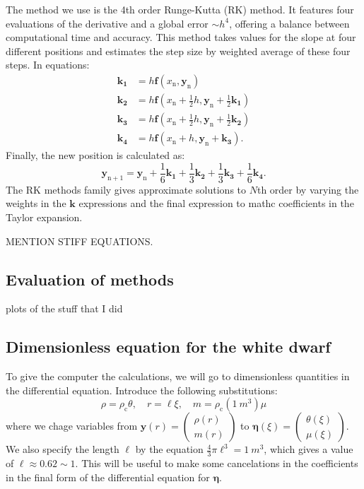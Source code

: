 \documentclass[]{article}
\renewcommand{\vec}[1]{\boldsymbol{#1}}
\begin{document}
	The method we use is the 4th order Runge-Kutta (RK) method. It features four evaluations of the derivative and a global error $\sim h^4$, offering a balance between computational time and accuracy. This method takes values for the slope at four different positions and estimates the step size by weighted average of these four steps. In equations:
	\begin{align*}
		\vec{k_1} &= h \vec{f}(x_\mathrm{n}, \vec{y}_\mathrm{n})\\
		\vec{k_2} &= h \vec{f}\left(x_\mathrm{n} + \frac{1}{2} h, \vec{y}_\mathrm{n} + \frac{1}{2}\vec{k_1}\right)\\
		\vec{k_3} &= h \vec{f}\left(x_\mathrm{n} + \frac{1}{2} h, \vec{y}_\mathrm{n} + \frac{1}{2}\vec{k_2}\right)\\
		\vec{k_4} &= h \vec{f}(x_\mathrm{n} + h, \vec{y}_\mathrm{n} + \vec{k_3}).
	\end{align*}
	Finally, the new position is calculated as:
	\begin{equation}
		\vec{y}_\mathrm{n+1} = \vec{y}_\mathrm{n} + \frac{1}{6} \vec{k_1} + \frac{1}{3} \vec{k_2} + \frac{1}{3} \vec{k_3} + \frac{1}{6} \vec{k_4}.
	\end{equation}
	The RK methods family gives approximate solutions to $N$th order by varying the weights in the $\vec{k}$ expressions and the final expression to mathc coefficients in the Taylor expansion.

	{\color{red} MENTION STIFF EQUATIONS.}

\subsection{Evaluation of methods}
	plots of the stuff that I did
\subsection{Dimensionless equation for the white dwarf}
	To give the computer the calculations, we will go to dimensionless quantities in the differential equation. Introduce the following substitutions:
	\begin{equation}
		\rho = \rho_\mathrm{c} \theta, \quad r = \ell \xi, \quad m = \rho_\mathrm{c} (\SI{1}{m^3}) \mu
	\end{equation}
	where we chage variables from $\vec{y}(r) = \begin{pmatrix}\rho(r) \\ m(r)\end{pmatrix}$ to $\vec{\eta}(\xi) = \begin{pmatrix}\theta(\xi)\\\mu(\xi)\end{pmatrix}$. We also specify the length $\ell$ by the equation $\frac{4}{3}\pi \ell^3 = \SI{1}{m^3}$, which gives a value of $\ell \approx 0.62 \sim 1$. This will be useful to make some cancelations in the coefficients in the final form of the differential equation for $\vec{\eta}$.
\end{document}
